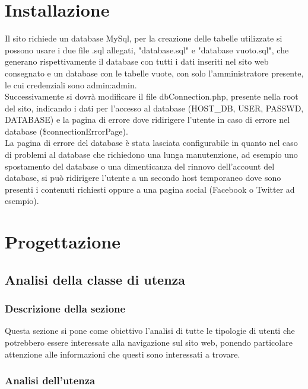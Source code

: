 \documentclass[openany, a4paper, 12pt]{report}
\begin{document}
	\chapter{Installazione}
	Il sito richiede un database MySql, per la creazione delle tabelle utilizzate si possono usare i due file .sql allegati, "database.sql" e "database vuoto.sql", che generano rispettivamente il database con tutti i dati inseriti nel sito web consegnato e un database con le tabelle vuote, con solo l'amministratore presente, le cui credenziali sono admin:admin.\\
	Successivamente si dovrà modificare il file dbConnection.php, presente nella root del sito, indicando i dati per l'accesso al database (HOST\_DB, USER, PASSWD, DATABASE) e la pagina di errore dove ridirigere l'utente in caso di errore nel database  (\$connectionErrorPage).\\
	La pagina di errore del database è stata lasciata configurabile in quanto nel caso di problemi al database che richiedono una lunga manutenzione, ad esempio uno spostamento del database o una dimenticanza del rinnovo dell'account del database, si può ridirigere l'utente a un secondo host temporaneo dove sono presenti i contenuti richiesti oppure a una pagina social (Facebook o Twitter ad esempio).

	\chapter{Progettazione}

	\section{Analisi della classe di utenza}

		\subsection{Descrizione della sezione}
		Questa sezione si pone come obiettivo l'analisi di tutte le tipologie di utenti che potrebbero essere interessate alla navigazione sul sito web, ponendo particolare attenzione alle informazioni che questi sono interessati a trovare.
		\subsection{Analisi dell'utenza}
\end{document}
